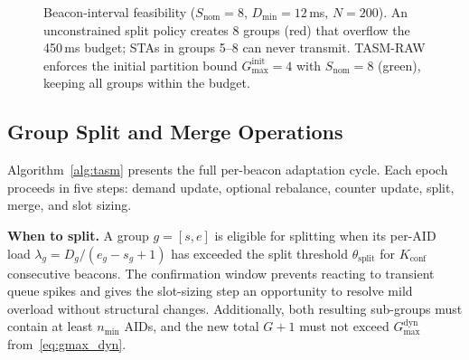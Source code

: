 \documentclass[conference]{IEEEtran}
\begin{document}
\begin{figure}[!t]
\centering
{}
\caption{Beacon-interval feasibility ($S_\mathrm{nom}\!=\!8$,
  $D_\mathrm{min}\!=\!12$\,ms, $N\!=\!200$).
  An unconstrained split policy creates 8 groups (red) that overflow the
  450\,ms budget; STAs in groups 5--8 can never transmit.
  TASM-RAW enforces the initial partition bound
  $G_\mathrm{max}^\mathrm{init}\!=\!4$ with $S_\mathrm{nom}\!=\!8$ (green),
  keeping all groups within the budget.}
\label{fig:overflow}
\end{figure}

\subsection{Group Split and Merge Operations}
\label{sec:split_merge}

Algorithm~\ref{alg:tasm} presents the full per-beacon adaptation cycle.
Each epoch proceeds in five steps: demand update, optional rebalance,
counter update, split, merge, and slot sizing.

\textbf{When to split.}
A group $g\!=\![s,e]$ is eligible for splitting when its per-AID load
$\lambda_g\!=\!D_g/(e_g\!-\!s_g\!+\!1)$ has exceeded the split threshold
$\theta_\mathrm{split}$ for $K_\mathrm{conf}$ consecutive beacons.
The confirmation window prevents reacting to transient queue spikes and
gives the slot-sizing step an opportunity to resolve mild overload without
structural changes.
Additionally, both resulting sub-groups must contain at least
$n_\mathrm{min}$ AIDs, and the new total $G\!+\!1$ must not exceed
$G_\mathrm{max}^\mathrm{dyn}$ from~\eqref{eq:gmax_dyn}.
\end{document}
